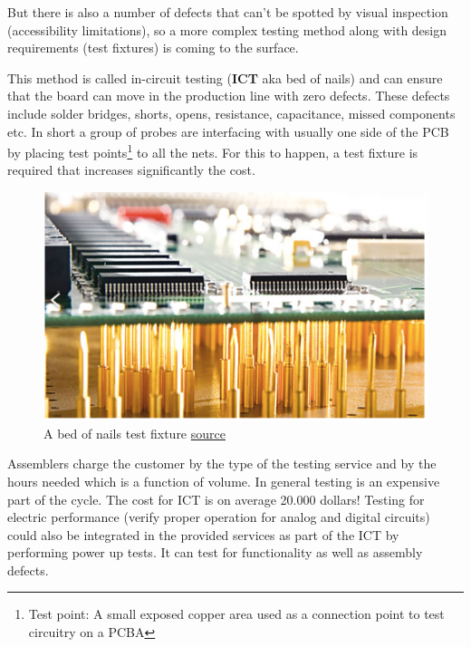 \documentclass[12pt]{article}
\begin{document}
But there is also a number of defects that can't be spotted by visual inspection (accessibility limitations), so a more complex testing method along with design requirements (test fixtures) is coming to the surface. 

This method is called in-circuit testing (\textbf{ICT} aka bed of nails) and can ensure that the board can move in the production line with zero defects. These defects include solder bridges, shorts, opens, resistance, capacitance, missed components etc. In short a group of probes are interfacing with usually one side of the PCB  by placing test points\footnote{Test point: A small exposed copper area used as a connection point to test circuitry on a PCBA} to all the nets. For this to happen, a test fixture is required that increases significantly the cost.


\begin{figure}[h!]
	\centering
	\includegraphics[keepaspectratio, width=\textwidth]{assets/bed_of_nails.png}
	\caption{A bed of nails test fixture \href{https://hackaday.com/2019/02/09/test-pcbs-on-a-bed-of-nails/}{source}}
\end{figure}

Assemblers charge the customer by the type of the testing service and by the hours needed which is a function of volume. In general testing is an expensive part of the cycle.
The cost for ICT is on average 20.000 dollars! 
Testing for electric performance (verify proper operation for analog and digital circuits) could also be integrated in the provided services as part of the ICT by performing power up tests. It can test for functionality as well as assembly defects.
\end{document}
